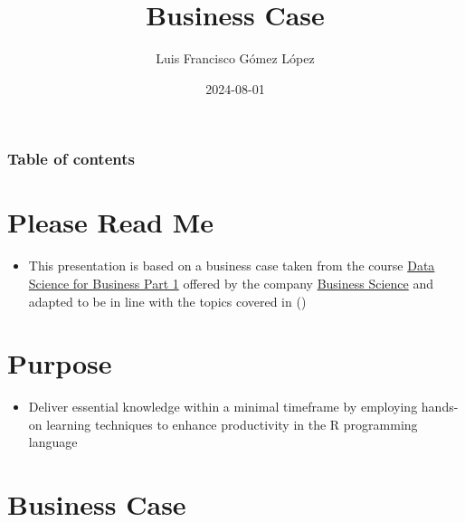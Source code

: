 \documentclass[
  ignorenonframetext,
]{beamer}
\title{Business Case}
\author{Luis Francisco Gómez López}
\date{2024-08-01}
\institute{FAEDIS}
\providecommand{\tightlist}{%
  \setlength{\itemsep}{0pt}\setlength{\parskip}{0pt}}\usepackage{longtable,booktabs,array}
\renewcommand*\contentsname{Table of contents}
\newcommand\contentsname{Table of contents}
\begin{document}
\frame{\titlepage}

\renewcommand*\contentsname{Table of contents}
\begin{frame}[allowframebreaks]
  \frametitle{Table of contents}
  \tableofcontents[hideallsubsections]
\end{frame}

\section{Please Read Me}\label{please-read-me}

\begin{frame}{}
\label{section}
\begin{itemize}
\tightlist
\item
  This presentation is based on a business case taken from the course
  \href{https://university.business-science.io/p/ds4b-101-r-business-analysis-r}{Data
  Science for Business Part 1} offered by the company
  \href{https://www.business-science.io/}{Business Science} and adapted
  to be in line with the topics covered in
  ()
\end{itemize}
\end{frame}

\section{Purpose}\label{purpose}

\begin{frame}{}
\label{section-1}
\begin{itemize}
\tightlist
\item
  Deliver essential knowledge within a minimal timeframe by employing
  hands-on learning techniques to enhance productivity in the R
  programming language
\end{itemize}
\end{frame}

\section{Business Case}\label{business-case}
\end{document}
